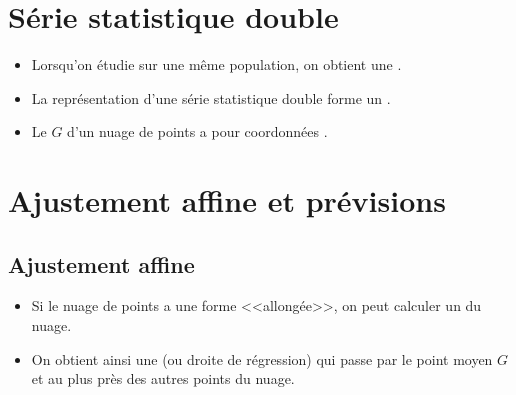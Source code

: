 \documentclass[12pt,a4paper]{article}
\date{}
\title{}
\begin{document}
{}

\section{Série statistique double}

\begin{mydefs}
	\begin{itemize}
		\item Lorsqu'on étudie  sur une même population, on obtient une .
		
		\item La représentation d'une série statistique double forme un .
		
		\item Le  $G$ d'un  nuage de points a pour coordonnées .
	\end{itemize}
	
\end{mydefs}



\newpage

\section{Ajustement affine et prévisions}


\subsection{Ajustement affine}
\begin{mydefs}
	\begin{itemize}
		\item Si le nuage de points a une forme <<allongée>>, on peut calculer un  du nuage. 
		\item On obtient ainsi une  (ou droite de régression) qui passe par le point moyen $G$ et au plus près des autres points du nuage.		
	\end{itemize}
\end{mydefs}

\end{document}
